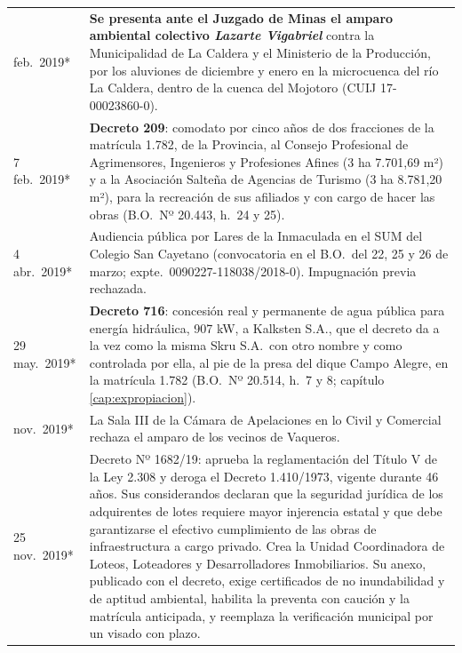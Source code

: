 \begin{longtable}{@{}p{2.7cm}p{10.3cm}@{}}
feb.\ 2019* & \textbf{Se presenta ante el Juzgado de Minas el amparo ambiental colectivo \textit{Lazarte Vigabriel}} contra la Municipalidad de La Caldera y el Ministerio de la Producción, por los aluviones de diciembre y enero en la microcuenca del río La Caldera, dentro de la cuenca del Mojotoro (CUIJ 17-00023860-0). \\
7 feb.\ 2019* & \textbf{Decreto 209}: comodato por cinco años de dos fracciones de la matrícula 1.782, de la Provincia, al Consejo Profesional de Agrimensores, Ingenieros y Profesiones Afines (3 ha 7.701,69 m²) y a la Asociación Salteña de Agencias de Turismo (3 ha 8.781,20 m²), para la recreación de sus afiliados y con cargo de hacer las obras (B.O.\ Nº 20.443, h.\ 24 y 25). \\
4 abr.\ 2019* & Audiencia pública por Lares de la Inmaculada en el SUM del Colegio San Cayetano (convocatoria en el B.O.\ del 22, 25 y 26 de marzo; expte.\ 0090227-118038/2018-0). Impugnación previa rechazada. \\
29 may.\ 2019* & \textbf{Decreto 716}: concesión real y permanente de agua pública para energía hidráulica, 907 kW, a Kalksten S.A., que el decreto da a la vez como la misma Skru S.A.\ con otro nombre y como controlada por ella, al pie de la presa del dique Campo Alegre, en la matrícula 1.782 (B.O.\ Nº 20.514, h.\ 7 y 8; capítulo \ref{cap:expropiacion}). \\
nov.\ 2019* & La Sala III de la Cámara de Apelaciones en lo Civil y Comercial rechaza el amparo de los vecinos de Vaqueros. \\
25 nov.\ 2019* & Decreto Nº 1682/19: aprueba la reglamentación del Título V de la Ley 2.308 y deroga el Decreto 1.410/1973, vigente durante 46 años. Sus considerandos declaran que la seguridad jurídica de los adquirentes de lotes requiere mayor injerencia estatal y que debe garantizarse el efectivo cumplimiento de las obras de infraestructura a cargo privado. Crea la Unidad Coordinadora de Loteos, Loteadores y Desarrolladores Inmobiliarios. Su anexo, publicado con el decreto, exige certificados de no inundabilidad y de aptitud ambiental, habilita la preventa con caución y la matrícula anticipada, y reemplaza la verificación municipal por un visado con plazo. \\

\end{longtable}
